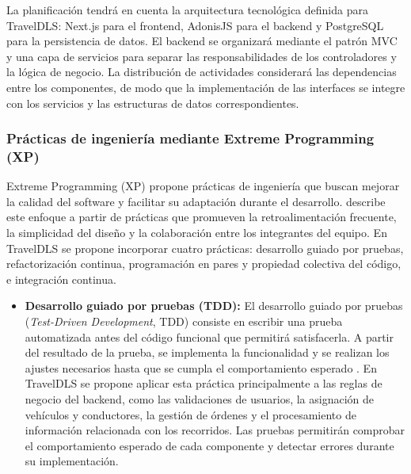 La planificación tendrá en cuenta la arquitectura tecnológica definida para TravelDLS: Next.js para el frontend, AdonisJS para el backend y PostgreSQL para la persistencia de datos. El backend se organizará mediante el patrón MVC y una capa de servicios para separar las responsabilidades de los controladores y la lógica de negocio. La distribución de actividades considerará las dependencias entre los componentes, de modo que la implementación de las interfaces se integre con los servicios y las estructuras de datos correspondientes.

\subsubsection{Prácticas de ingeniería mediante Extreme Programming (XP)}

Extreme Programming (XP) propone prácticas de ingeniería que buscan mejorar la calidad del software y facilitar su adaptación durante el desarrollo. \textcite{beck2000xp} describe este enfoque a partir de prácticas que promueven la retroalimentación frecuente, la simplicidad del diseño y la colaboración entre los integrantes del equipo. En TravelDLS se propone incorporar cuatro prácticas: desarrollo guiado por pruebas, refactorización continua, programación en pares y propiedad colectiva del código, e integración continua.

\begin{itemize}
	\item \textbf{Desarrollo guiado por pruebas (TDD):} El desarrollo guiado por pruebas (\textit{Test-Driven Development}, TDD) consiste en escribir una prueba automatizada antes del código funcional que permitirá satisfacerla. A partir del resultado de la prueba, se implementa la funcionalidad y se realizan los ajustes necesarios hasta que se cumpla el comportamiento esperado \parencite{beck2000xp}. En TravelDLS se propone aplicar esta práctica principalmente a las reglas de negocio del backend, como las validaciones de usuarios, la asignación de vehículos y conductores, la gestión de órdenes y el procesamiento de información relacionada con los recorridos. Las pruebas permitirán comprobar el comportamiento esperado de cada componente y detectar errores durante su implementación.
\end{itemize}

